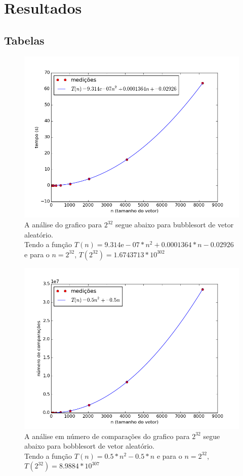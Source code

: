 \documentclass[12pt,a4paper,twoside]{report}
\begin{document}
\chapter{Resultados}
\section{Tabelas}



\begin{figure}[ht]
\centering \includegraphics[scale=0.8]{../bolha/imagens/bolhaAleatorio0.png}
\caption{A análise do grafico para $2^{32}$ segue abaixo para bubblesort de vetor aleatório.\\
Tendo a função $T(n) = 9.314\mathrm{e}-07*n^2+0.0001364*n-0.02926$ e para o $n =2^{32}$, $T(2^{32}) = 1.6743713 * 10^{302}$}
\label{fig:bolhaAleatorio0}
\end{figure}

\begin{figure}[ht]
\centering \includegraphics[scale=0.8]{../bolha/imagens/bolhaAleatorio1.png}
\caption{A análise em número de comparações do grafico para $2^{32}$ segue abaixo para bobblesort de vetor aleatório.\\
Tendo a função $T(n) = 0.5*n^2 - 0.5*n$ e para o $n =2^{32}$, $T(2^{32}) = 8.9884 * 10^{307}$}
\label{fig:bolhaAleatorio1}
\end{figure}
\end{document}

